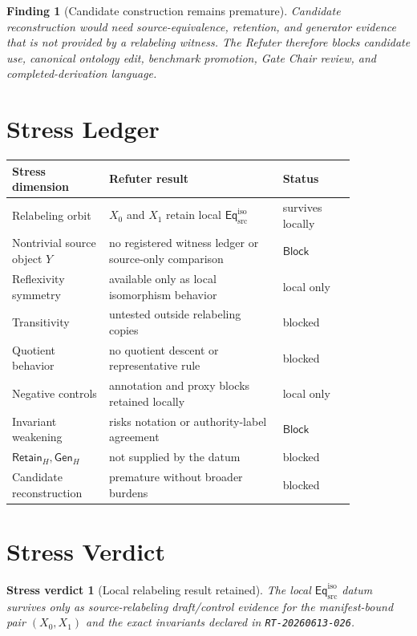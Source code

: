 \documentclass[11pt]{article}
\newcommand{\EqIso}{\mathsf{Eq}_{\mathrm{src}}^{\mathrm{iso}}}
\newcommand{\GenH}{\mathsf{Gen}_{H}}
\newcommand{\RetainH}{\mathsf{Retain}_{H}}
\newcommand{\Block}{\mathsf{Block}}
\newtheorem{finding}{Finding}
\newtheorem{verdict}{Stress verdict}
\begin{document}
\begin{finding}[Candidate construction remains premature]
Candidate reconstruction would need source-equivalence, retention, and
generator evidence that is not provided by a relabeling witness. The
Refuter therefore blocks candidate use, canonical ontology edit, benchmark
promotion, Gate Chair review, and completed-derivation language.
\end{finding}

\section{Stress Ledger}

\begin{center}
\begin{tabular}{p{0.24\linewidth}p{0.43\linewidth}p{0.18\linewidth}}
\textbf{Stress dimension} & \textbf{Refuter result} & \textbf{Status} \\
\hline
Relabeling orbit & \(X_{0}\) and \(X_{1}\) retain local \(\EqIso\) & survives locally \\
Nontrivial source object \(Y\) & no registered witness ledger or source-only comparison & \(\Block\) \\
Reflexivity symmetry & available only as local isomorphism behavior & local only \\
Transitivity & untested outside relabeling copies & blocked \\
Quotient behavior & no quotient descent or representative rule & blocked \\
Negative controls & annotation and proxy blocks retained locally & local only \\
Invariant weakening & risks notation or authority-label agreement & \(\Block\) \\
\(\RetainH,\GenH\) & not supplied by the datum & blocked \\
Candidate reconstruction & premature without broader burdens & blocked \\
\end{tabular}
\end{center}

\section{Stress Verdict}

\begin{verdict}[Local relabeling result retained]
The local \(\EqIso\) datum survives only as source-relabeling
draft/control evidence for the manifest-bound pair \((X_{0},X_{1})\) and
the exact invariants declared in \texttt{RT-20260613-026}.
\end{verdict}
\end{document}
